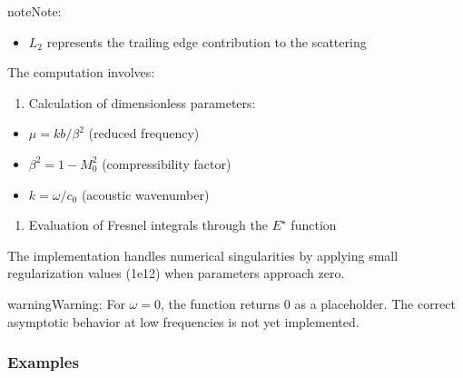 \documentclass[letterpaper,10pt,english]{sphinxmanual}
\begin{document}
\begin{fulllineitems}
\begin{sphinxadmonition}{note}{Note:}
\begin{itemize}
\item {} 
\sphinxAtStartPar
\(L_2\) represents the trailing edge contribution to the scattering

\end{itemize}

\sphinxAtStartPar
The computation involves:
\begin{enumerate}
%
\item {} 
\sphinxAtStartPar
Calculation of dimensionless parameters:

\end{enumerate}
\begin{itemize}
\item {} 
\sphinxAtStartPar
\(\mu = kb/\beta^2\) (reduced frequency)

\item {} 
\sphinxAtStartPar
\(\beta^2 = 1 - M_0^2\) (compressibility factor)

\item {} 
\sphinxAtStartPar
\(k = \omega/c_0\) (acoustic wavenumber)

\end{itemize}
\begin{enumerate}
%
\setcounter{enumi}{1}
\item {} 
\sphinxAtStartPar
Evaluation of Fresnel integrals through the \(E^\star\) function

\end{enumerate}

\sphinxAtStartPar
The implementation handles numerical singularities by applying
small regularization values (1e\sphinxhyphen{}12) when parameters approach zero.
\end{sphinxadmonition}

\begin{sphinxadmonition}{warning}{Warning:}
\sphinxAtStartPar
For \(\omega = 0\), the function returns 0 as a placeholder. The correct
asymptotic behavior at low frequencies is not yet implemented.
\end{sphinxadmonition}
\subsubsection*{Examples}


\end{fulllineitems}
\end{document}
